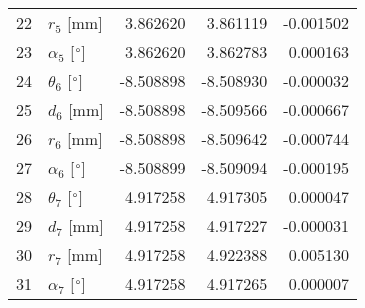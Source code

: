 \documentclass{standalone}%
\begin{document}
\begin{tabular}{llrrr}
22 &              $r_{5}$ [mm] &  3.862620 &   3.861119 &  -0.001502 \\
23 &  $\alpha_{5}$ [$\degree$] &  3.862620 &   3.862783 &   0.000163 \\
24 &  $\theta_{6}$ [$\degree$] & -8.508898 &  -8.508930 &  -0.000032 \\
25 &              $d_{6}$ [mm] & -8.508898 &  -8.509566 &  -0.000667 \\
26 &              $r_{6}$ [mm] & -8.508898 &  -8.509642 &  -0.000744 \\
27 &  $\alpha_{6}$ [$\degree$] & -8.508899 &  -8.509094 &  -0.000195 \\
28 &  $\theta_{7}$ [$\degree$] &  4.917258 &   4.917305 &   0.000047 \\
29 &              $d_{7}$ [mm] &  4.917258 &   4.917227 &  -0.000031 \\
30 &              $r_{7}$ [mm] &  4.917258 &   4.922388 &   0.005130 \\
31 &  $\alpha_{7}$ [$\degree$] &  4.917258 &   4.917265 &   0.000007 \\
\bottomrule
\end{tabular}
%
\end{document}

